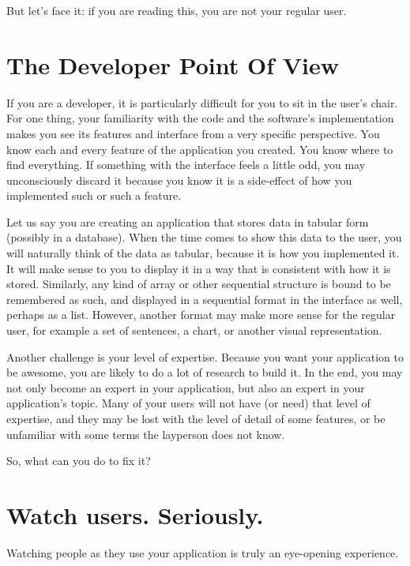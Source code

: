 But let's face it: if you are reading this, you are not your regular user.

\section*{The Developer Point Of View}

If you are a developer, it is particularly difficult for you to sit in the user's chair. For one
thing, your familiarity with the code and the software's implementation makes
you see its features and interface from a very specific perspective. You
know each and every feature of the application you created. You know where to
find everything. If something with the interface feels a little odd, you may
unconsciously discard it because you know it is a side-effect of how you
implemented such or such a feature.

Let us say you are creating an application that stores data in tabular form
(possibly in a database). When the time comes to show this data to the user, you
will naturally think of the data as tabular, because it is how you implemented
it. It will make sense to you to display it in a way that is consistent with how
it is stored. Similarly, any kind of array or other sequential structure is
bound to be remembered as such, and displayed in a sequential format in the
interface as well, perhaps as a list. However, another format may make more
sense for the regular user, for example a set of sentences, a chart, or another
visual representation.

Another challenge is your level of expertise. Because you want your
application to be awesome, you are likely to do a lot of research to build it.
In the end, you may not only become an expert in your application, but also an
expert in your application's topic. Many of your users will not have (or need)
that level of expertise, and they may be lost with the level of detail of some
features, or be unfamiliar with some terms the layperson does not know.

So, what can you do to fix it?

\section*{Watch users. Seriously.}

Watching people as they use your application is truly an eye-opening experience.

